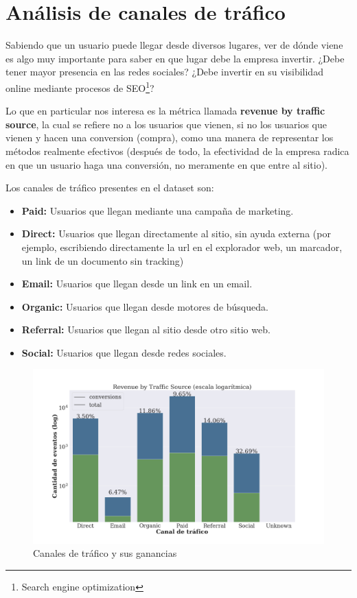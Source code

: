 \documentclass[a4paper]{article}
\begin{document}
\section{Análisis de canales de tráfico}

Sabiendo que un usuario puede llegar desde diversos lugares, ver de dónde viene es algo muy importante para saber en que lugar debe la empresa invertir. ¿Debe tener mayor presencia en las redes sociales? ¿Debe invertir en su visibilidad online mediante procesos de SEO\footnote{Search engine optimization}? 

Lo que en particular nos interesa es la métrica llamada \textbf{revenue by traffic source}, la cual se refiere no a los usuarios que vienen, si no los usuarios que vienen y hacen una conversion (compra), como una manera de representar los métodos realmente efectivos (después de todo, la efectividad de la empresa radica en que un usuario haga una conversión, no meramente en que entre al sitio).

Los canales de tráfico presentes en el dataset son:
\begin{itemize}
\item \textbf{Paid: } Usuarios que llegan mediante una campaña de marketing.
\item \textbf{Direct: } Usuarios que llegan directamente al sitio, sin ayuda externa (por ejemplo, escribiendo directamente la url en el explorador web, un marcador, un link de un documento sin tracking)
\item \textbf{Email: } Usuarios que llegan desde un link en un email.
\item \textbf{Organic: } Usuarios que llegan desde motores de búsqueda.
\item \textbf{Referral: } Usuarios que llegan al sitio desde otro sitio web.
\item \textbf{Social: } Usuarios que llegan desde redes sociales.
\end{itemize}

\begin{figure}[h!]
	\includegraphics[width=\linewidth]{figures/180-revenue_traffic-boxplot.png}
	\caption{Canales de tráfico y sus ganancias}
	\label{fig:traffic}
\end{figure}
\end{document}
